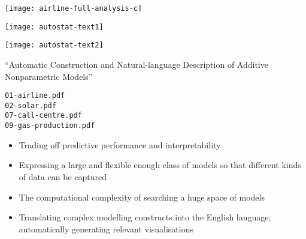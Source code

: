 \centerline{\texttt{[image: airline-full-analysis-c]}}


\centerline{\texttt{[image: autostat-text1]}}

\centerline{\texttt{[image: autostat-text2]}}

{\small ``Automatic Construction and Natural-language Description of Additive
Nonparametric Models''} \\

\begin{center}
{\tt 01-airline.pdf \\
02-solar.pdf \\
07-call-centre.pdf \\
09-gas-production.pdf\\
}
\end{center}


\begin{itemize}
\item Trading off predictive performance and interpretability
\item Expressing a large and flexible enough class of models so that
  different kinds of data can be captured
\item The computational complexity of searching a huge space of models
\item Translating complex modelling constructs into the English language;
  automatically generating relevant visualisations
\end{itemize}



